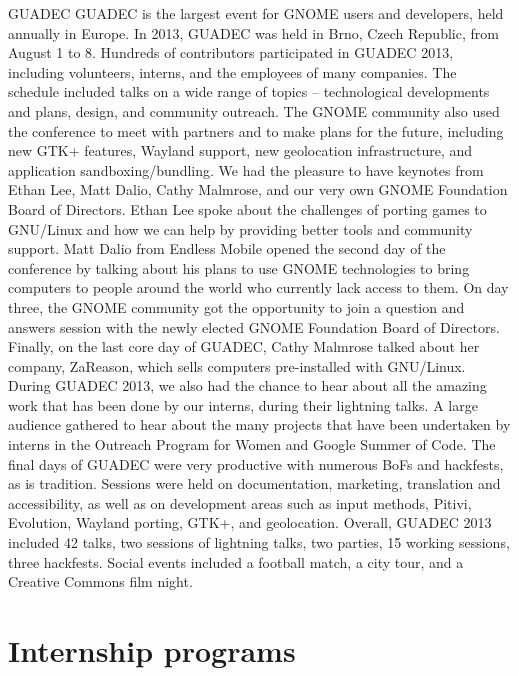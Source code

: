 \documentclass{scrreprt}
\begin{document}
GUADEC
GUADEC is the largest event for GNOME users and developers, held annually in Europe. In 2013, GUADEC was held in Brno, Czech Republic, from August 1 to 8.
Hundreds of contributors participated in GUADEC 2013, including volunteers, interns, and the employees of many companies. The schedule included talks on a wide range of topics -- technological developments and plans, design, and community outreach. The GNOME community also used the conference to meet with partners and to make plans for the future, including new GTK+ features, Wayland support, new geolocation infrastructure, and application sandboxing/bundling.
We had the pleasure to have keynotes from Ethan Lee, Matt Dalio, Cathy Malmrose, and our very own GNOME Foundation Board of Directors.
Ethan Lee spoke about the challenges of porting games to GNU/Linux and how we can help by providing better tools and community support.
Matt Dalio from Endless Mobile opened the second day of the conference by talking about his plans to use GNOME technologies to bring computers to people around the world who currently lack access to them.
On day three, the GNOME community got the opportunity to join a question and answers session with the newly elected GNOME Foundation Board of Directors.
Finally, on the last core day of GUADEC, Cathy Malmrose talked about her company, ZaReason, which sells computers pre-installed with GNU/Linux.
During GUADEC 2013, we also had the chance to hear about all the amazing work that has been done by our interns, during their lightning talks. A large audience gathered to hear about the many projects that have been undertaken by interns in the Outreach Program for Women and Google Summer of Code.
The final days of GUADEC were very productive with numerous BoFs and hackfests, as is tradition. Sessions were held on documentation, marketing, translation and accessibility, as well as on development areas such as input methods, Pitivi, Evolution, Wayland porting, GTK+, and geolocation.
Overall, GUADEC 2013 included 42 talks, two sessions of lightning talks, two parties, 15 working sessions, three hackfests. Social events included a football match, a city tour, and a Creative Commons film night.









\section{Internship programs}
\end{document}
